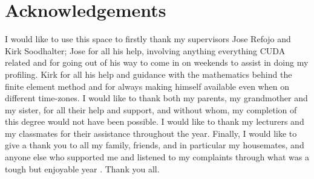 \clearpage
\thispagestyle{empty}
\section*{Acknowledgements}
\label{sec:ack}

\vspace{1.0cm}

\begin{small}
I would like to use this space to firstly thank my supervisors Jose Refojo and Kirk Soodhalter; Jose for all his help, involving anything everything CUDA related and for going out of his way to come in on weekends to assist in doing my profiling. Kirk for all his help and guidance with the mathematics behind the finite element method and for always making himself available even when on different time-zones. I would like to thank both my parents, my grandmother and my sister, for all their help and support, and without whom, my completion of this degree would not have been possible. I would like to thank my lecturers and my classmates for their assistance throughout the year. Finally, I would like to give a thank you to all my family, friends, and in particular my housemates, and anyone else who supported me and listened to my complaints through what was a tough but enjoyable year . Thank you all.
\end{small}